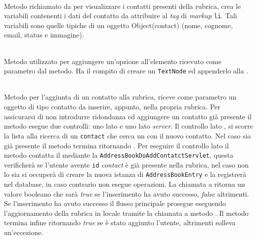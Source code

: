 \begin{description}
	\item{}\\

Metodo richiamato da  per visualizzare i contatti presenti della rubrica, crea le variabili contenenti i dati del contatto da attribuire al \textit{tag} di \textit{markup} \texttt{li}. Tali variabili sono quelle tipiche di un oggetto Object(contact) (nome, cognome, email, status e immagine).


\item{}\\
Metodo utilizzato per aggiungere un'opzione all'elemento  ricevuto come parametro dal metodo. Ha il compito di creare un \texttt{TextNode} ed appenderlo alla .

	
	\item{}\\
	Metodo per l'aggiunta di un contatto alla rubrica, riceve come parametro un oggetto di tipo contatto da inserire, appunto, nella propria rubrica. 
Per assicurarsi di non introdurre ridondanza ed aggiungere un contatto già presente il metodo esegue due controlli: uno lato  e uno lato \textit{server}. 
Il controllo lato , si scorre la lista  alla ricerca di un \texttt{contact} che cerca un  con il nuovo contatto. Nel caso sia già presente il metodo termina ritornando . Per eseguire il controllo lato  il metodo contatta il  mediante la  \texttt{AddressBookDoAddContatctServlet}, questa verificherà se l'utente avente \texttt{id} \textit{contact} è già presente nella rubrica, nel caso non lo sia si occuperà di creare la nuova istanza di \texttt{AddressBookEntry} e la registrerà nel database, in caso contrario non esegue operazioni. 
La chiamata a  ritorna un valore booleano che sarà \textit{true} se l'inserimento ha avuto successo, \textit{false} altrimenti. 
Se l'inserimento ha avuto successo il flusso principale prosegue eseguendo l'aggiornamento della rubrica in locale tramite la chiamata a metodo . Il metodo termina infine ritornando \textit{true} se è stato aggiunto l'utente, altrimenti solleva un'eccezione.


\end{description}
